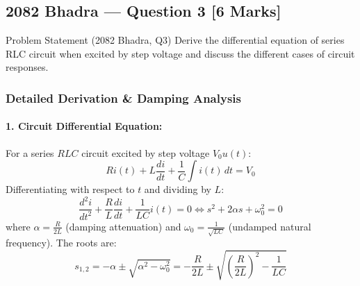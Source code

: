 \documentclass[11pt,a4paper,oneside]{article}
\begin{document}
\newpage

\subsection{2082 Bhadra --- Question 3 [6 Marks]}

\begin{questionbox}{Problem Statement (2082 Bhadra, Q3)}
Derive the differential equation of series RLC circuit when excited by step voltage and discuss the different cases of circuit responses.
\end{questionbox}

\subsubsection*{Detailed Derivation \& Damping Analysis}
\paragraph{1. Circuit Differential Equation:}
For a series $RLC$ circuit excited by step voltage $V_0 u(t)$:
\[
R i(t) + L \frac{di}{dt} + \frac{1}{C}\int i(t)\,dt = V_0
\]
Differentiating with respect to $t$ and dividing by $L$:
\begin{equation}
  \frac{d^2 i}{dt^2} + \frac{R}{L}\frac{di}{dt} + \frac{1}{LC}i(t) = 0 \iff s^2 + 2\alpha s + \omega_0^2 = 0
\end{equation}
where $\alpha = \frac{R}{2L}$ (damping attenuation) and $\omega_0 = \frac{1}{\sqrt{LC}}$ (undamped natural frequency). The roots are:
\begin{equation}
  s_{1,2} = -\alpha \pm \sqrt{\alpha^2 - \omega_0^2} = -\frac{R}{2L} \pm \sqrt{\left(\frac{R}{2L}\right)^2 - \frac{1}{LC}}
\end{equation}
\end{document}
